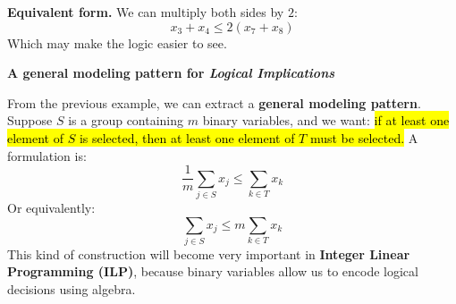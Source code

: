 \begin{examplebox}
    \highspace
    \textcolor{Green3}{ \textbf{Equivalent form.}} We can multiply both sides by $2$:
    \begin{equation*}
        x_3+x_4\leq2(x_7+x_8)
    \end{equation*}
    Which may make the logic easier to see.
\end{examplebox}

\begin{flushleft}
    \textcolor{Green3}{ \textbf{A general modeling pattern for \emph{Logical Implications}}}
\end{flushleft}
From the previous example, we can extract a \textbf{general modeling pattern}. Suppose $S$ is a group containing $m$ binary variables, and we want: \hl{if at least one element of $S$ is selected, then at least one element of $T$ must be selected.} A formulation is:
\begin{equation}
    \frac{1}{m}\sum_{j\in S}x_j
    \leq
    \sum_{k\in T}x_k
\end{equation}
Or equivalently:
\begin{equation}
    \sum_{j\in S}x_j
    \leq
    m\sum_{k\in T}x_k
\end{equation}
This kind of construction will become very important in \textbf{Integer Linear Programming (ILP)}, because binary variables allow us to encode logical decisions using algebra.

